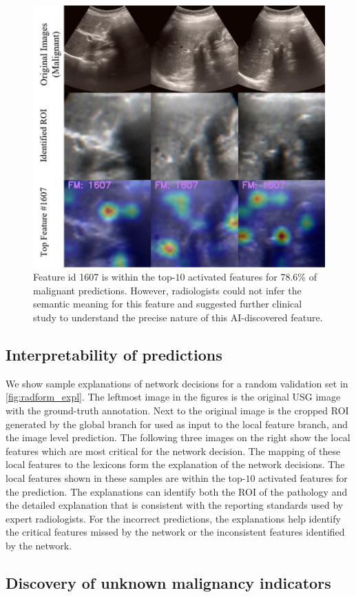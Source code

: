 \begin{figure}[t]
	\centering
	\includegraphics[width=0.6\linewidth]{figs/radformer/malg-1607.png}
	\caption[Visualization of unknown feature]{Feature id 1607 is within the top-$10$ activated features for 78.6\% of malignant predictions. However, radiologists could not infer the semantic meaning for this feature and suggested further clinical study to understand the precise nature of this AI-discovered feature.}
	\label{fig:unknown_feat}
\end{figure}

\subsection{Interpretability of predictions}
%
We show sample explanations of network decisions for a random validation set in \cref{fig:radform_expl}. The leftmost image in the figures is the original USG image with the ground-truth annotation. Next to the original image is the cropped ROI generated by the global branch for used as input to the local feature branch, and the image level prediction. The following three images on the right show the local features which are most critical for the network decision. The mapping of these local features to the lexicons form the explanation of the network decisions. The local features shown in these samples are within the top-$10$ activated features for the prediction. The \radformer explanations can identify both the ROI of the pathology and the detailed explanation that is consistent with the reporting standards used by expert radiologists. For the incorrect predictions, the explanations help identify the critical features missed by the network or the inconsistent features identified by the network. 

\subsection{Discovery of unknown malignancy indicators}

